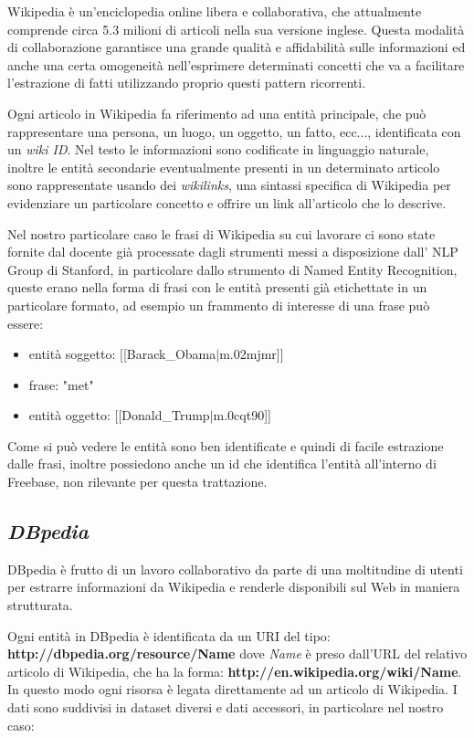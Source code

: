 \documentclass[10pt,a4paper,twocolumn]{article}
\begin{document}
Wikipedia è un'enciclopedia online libera e collaborativa, che attualmente comprende circa 5.3 milioni di articoli nella sua versione inglese. Questa modalità di collaborazione garantisce una grande qualità e affidabilità sulle informazioni ed anche una certa omogeneità nell'esprimere determinati concetti che va a facilitare l'estrazione di fatti utilizzando proprio questi pattern ricorrenti.
 
Ogni articolo in Wikipedia fa riferimento ad una entità principale, che può rappresentare una persona, un luogo, un oggetto, un fatto, ecc..., identificata con un \textit{wiki ID}. Nel testo le informazioni sono codificate in linguaggio naturale, inoltre le entità secondarie eventualmente presenti in un determinato articolo sono rappresentate usando dei \textit{wikilinks}, una sintassi specifica di Wikipedia per evidenziare un particolare concetto e offrire un link all'articolo che lo descrive.

Nel nostro particolare caso le frasi di Wikipedia su cui lavorare ci sono state fornite dal docente già processate dagli strumenti messi a disposizione dall' NLP Group di Stanford, in particolare dallo strumento di Named Entity Recognition, queste erano nella forma di frasi con le entità presenti già etichettate in un particolare formato, ad esempio un frammento di interesse di una frase può essere:

\begin{itemize}
	\item entità soggetto: [[Barack\_Obama$|$m.02mjmr]]
	\item frase: "met"
	\item entità oggetto: [[Donald\_Trump$|$m.0cqt90]]
\end{itemize}

Come si può vedere le entità sono ben identificate e quindi di facile estrazione dalle frasi, inoltre possiedono anche un id che identifica l'entità all'interno di Freebase, non rilevante per questa trattazione.

\subsection*{\textit{DBpedia}}

DBpedia è frutto di un lavoro collaborativo da parte di una moltitudine di utenti per estrarre informazioni da Wikipedia e renderle disponibili sul Web in maniera strutturata.

Ogni entità in DBpedia è identificata da un URI del tipo:
\bigbreak
\textbf{http://dbpedia.org/resource/Name}
\bigbreak
dove \textit{Name} è preso dall'URL del relativo articolo di Wikipedia, che ha la forma:
\bigbreak
\textbf{http://en.wikipedia.org/wiki/Name}.
\bigbreak
In questo modo ogni risorsa è legata direttamente ad un articolo di Wikipedia. I dati sono suddivisi in dataset diversi e dati accessori, in particolare nel nostro caso:
\end{document}
